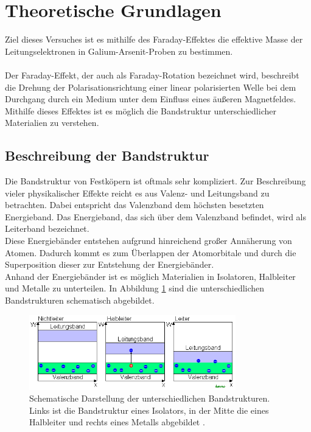\section{Theoretische Grundlagen}
Ziel dieses Versuches ist es mithilfe des Faraday-Effektes die effektive Masse der Leitungselektronen in 
Galium-Arsenit-Proben zu bestimmen. \\
\\
Der Faraday-Effekt, der auch als Faraday-Rotation bezeichnet wird, beschreibt die Drehung der
Polarisationsrichtung einer linear polarisierten Welle bei dem Durchgang durch ein Medium 
unter dem Einfluss eines äußeren Magnetfeldes. Mithilfe dieses Effektes ist es möglich die 
Bandstruktur unterschiedlicher Materialien zu verstehen. \\

\subsection{Beschreibung der Bandstruktur}
Die Bandstruktur von Festköpern ist oftmals sehr kompliziert. Zur Beschreibung vieler physikalischer
Effekte reicht es aus Valenz- und Leitungsband zu betrachten. 
Dabei entspricht das Valenzband dem höchsten besetzten Energieband. Das Energieband, das sich über dem 
Valenzband befindet, wird als Leiterband bezeichnet. \\
Diese Energiebänder entstehen aufgrund hinreichend großer Annäherung von Atomen. Dadurch kommt es zum 
Überlappen der Atomorbitale und durch die Superposition dieser zur Entstehung der Energiebänder. \\
Anhand der Energiebänder ist es möglich Materialien in Isolatoren, Halbleiter und Metalle zu unterteilen. 
In Abbildung \ref{fig:Bandstrukturen} sind die unterschiedlichen Bandstrukturen schematisch abgebildet.
\begin{figure}[H]
    \centering
    \includegraphics[width=0.8\textwidth]{images/Bandstruktur.png}
    \caption{Schematische Darstellung der unterschiedlichen Bandstrukturen. Links ist die Bandstruktur eines Isolators, 
    in der Mitte die eines Halbleiter und rechts eines Metalls abgebildet \cite{BS}.}
    \label{fig:Bandstrukturen}
\end{figure} \noindent
